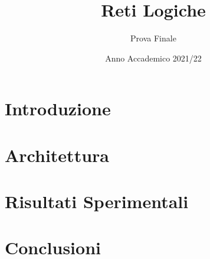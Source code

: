 \documentclass[11pt]{report}
\title{Reti Logiche}
\author{Prova Finale}
\date{Anno Accademico 2021/22}
\begin{document}



\tableofcontents

\chapter{Introduzione}


\chapter{Architettura}


\chapter{Risultati Sperimentali}


\chapter{Conclusioni}

\end{document}
